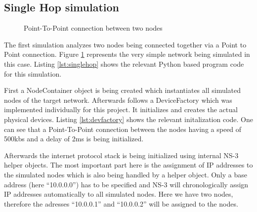\subsection{Single Hop simulation}

%
\begin{figure}
\begin{centering}

\par\end{centering}

\caption{\label{fig:singlehop}Point-To-Point connection between two nodes}

\end{figure}


The first simulation analyzes two nodes being connected together via
a Point to Point connection. Figure \ref{fig:singlehop} represents
the very simple network being simulated in this case. Listing \ref{lst:singlehop}
shows the relevant Python based program code for this simulation.\texttt{\small }{\small \par}

First a NodeContainer object is being created which instantiates all
simulated nodes of the target network. Afterwards follows a DeviceFactory
which was implemented individually for this project. It initializes
and creates the actual physical devices. Listing \ref{lst:devfactory}
shows the relevant initalization code. One can see that a Point-To-Point
connection between the nodes having a speed of 500kbs and a delay
of 2ms is being initialized.

\texttt{\small }{\small \par}

Afterwards the internet protocol stack is being initialized using
internal NS-3 helper objects. The most important part here is the
assignment of IP addresses to the simulated nodes which is also being
handled by a helper object. Only a base address (here {}``10.0.0.0'')
has to be specified and NS-3 will chronologically assign IP addresses
automatically to all simulated nodes. Here we have two nodes, therefore
the adresses {}``10.0.0.1'' and {}``10.0.0.2'' will be assigned
to the nodes.

